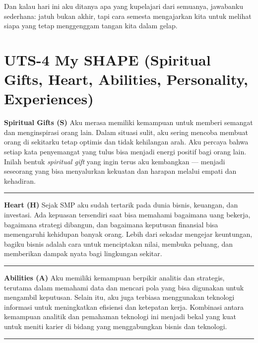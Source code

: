 \documentclass[
  letterpaper,
  DIV=11,
  numbers=noendperiod]{scrreprt}
\begin{document}
Dan kalau hari ini aku ditanya apa yang kupelajari dari semuanya,
jawabanku sederhana: jatuh bukan akhir, tapi cara semesta mengajarkan
kita untuk melihat siapa yang tetap menggenggam tangan kita dalam gelap.


\chapter{UTS-4 My SHAPE (Spiritual Gifts, Heart, Abilities, Personality,
Experiences)}\label{uts-4-my-shape-spiritual-gifts-heart-abilities-personality-experiences}

\textbf{Spiritual Gifts (S)} Aku merasa memiliki kemampuan untuk memberi
semangat dan menginspirasi orang lain. Dalam situasi sulit, aku sering
mencoba membuat orang di sekitarku tetap optimis dan tidak kehilangan
arah. Aku percaya bahwa setiap kata penyemangat yang tulus bisa menjadi
energi positif bagi orang lain. Inilah bentuk \emph{spiritual gift} yang
ingin terus aku kembangkan --- menjadi seseorang yang bisa menyalurkan
kekuatan dan harapan melalui empati dan kehadiran.

\begin{center}\rule{0.5\linewidth}{0.5pt}\end{center}

\textbf{Heart (H)} Sejak SMP aku sudah tertarik pada dunia bisnis,
keuangan, dan investasi. Ada kepuasan tersendiri saat bisa memahami
bagaimana uang bekerja, bagaimana strategi dibangun, dan bagaimana
keputusan finansial bisa memengaruhi kehidupan banyak orang. Lebih dari
sekadar mengejar keuntungan, bagiku bisnis adalah cara untuk menciptakan
nilai, membuka peluang, dan memberikan dampak nyata bagi lingkungan
sekitar.

\begin{center}\rule{0.5\linewidth}{0.5pt}\end{center}

\textbf{Abilities (A)} Aku memiliki kemampuan berpikir analitis dan
strategis, terutama dalam memahami data dan mencari pola yang bisa
digunakan untuk mengambil keputusan. Selain itu, aku juga terbiasa
menggunakan teknologi informasi untuk meningkatkan efisiensi dan
ketepatan kerja. Kombinasi antara kemampuan analitik dan pemahaman
teknologi ini menjadi bekal yang kuat untuk meniti karier di bidang yang
menggabungkan bisnis dan teknologi.

\begin{center}\rule{0.5\linewidth}{0.5pt}\end{center}
\end{document}
